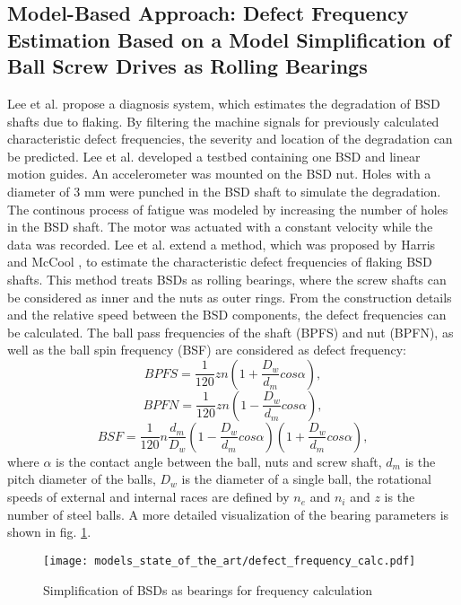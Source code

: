 \subsection{Model-Based Approach: Defect Frequency Estimation Based on a Model Simplification of Ball Screw Drives as Rolling Bearings}
Lee et al. \cite{Lee2015} propose a diagnosis system, which estimates the degradation of BSD shafts due to flaking. By filtering the machine signals for previously calculated characteristic defect frequencies, the severity and location of the degradation can be predicted. Lee et al. developed a testbed containing one BSD and linear motion guides. An accelerometer was mounted on the BSD nut. Holes with a diameter of 3 mm were punched in the BSD shaft to simulate the degradation. The continous process of fatigue was modeled by increasing the number of holes in the BSD shaft. The motor was actuated with a constant velocity while the data was recorded. Lee et al. extend a method, which was proposed by Harris and McCool \cite{Harris1996}, to estimate the characteristic defect frequencies of flaking BSD shafts. This method treats BSDs as rolling bearings, where the screw shafts can be considered as inner and the nuts as outer rings. From the construction details and the relative speed between the BSD components, the defect frequencies can be calculated. The ball pass frequencies of the shaft (BPFS) and nut (BPFN), as well as the ball spin frequency (BSF) are considered as defect frequency: 
\begin{equation}
    BPFS = \frac{1}{120}zn(1+\frac{D_{w}}{d_{m}}cos\alpha),
    \label{eq:defect_frequency}
\end{equation}
\begin{equation}
    BPFN = \frac{1}{120}zn(1-\frac{D_{w}}{d_{m}}cos\alpha),
\end{equation}
\begin{equation}
    BSF = \frac{1}{120}n\frac{d_{m}}{D_{w}} (1-\frac{D_{w}}{d_{m}}cos\alpha)(1+\frac{D_{w}}{d_{m}}cos\alpha) ,
\end{equation}
where $\alpha$ is the contact angle between the ball, nuts and screw shaft, $d_{m}$ is the pitch diameter of the balls, $D_{w}$ is the diameter of a single ball, the rotational speeds of external and internal races are defined by $n_{e}$ and $n_{i}$ and $z$ is the number of steel balls. A more detailed visualization of the bearing parameters is shown in fig. \ref{fig:defect_frequency_calc}. 

\begin{figure}[H]
  \centering
  \texttt{[image: models\_state\_of\_the\_art/defect\_frequency\_calc.pdf]}
  \caption{Simplification of BSDs as bearings for frequency calculation \cite{Lee2015}}
  \label{fig:defect_frequency_calc}
\end{figure}

